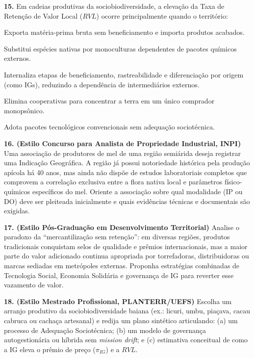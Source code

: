 \textbf{15.} Em cadeias produtivas da sociobiodiversidade, a elevação da Taxa de Retenção de Valor Local ($RVL$) ocorre principalmente quando o território:
\begin{alternativas}
  \item Exporta matéria-prima bruta sem beneficiamento e importa produtos acabados.
  \item Substitui espécies nativas por monoculturas dependentes de pacotes químicos externos.
  \item Internaliza etapas de beneficiamento, rastreabilidade e diferenciação por origem (como IGs), reduzindo a dependência de intermediários externos.
  \item Elimina cooperativas para concentrar a terra em um único comprador monopsônico.
  \item Adota pacotes tecnológicos convencionais sem adequação sociotécnica.
\end{alternativas}


\textbf{16. (Estilo Concurso para Analista de Propriedade Industrial, INPI)} Uma associação de produtores de mel de uma região semiárida deseja registrar uma Indicação Geográfica. A região já possui notoriedade histórica pela produção apícola há 40 anos, mas ainda não dispõe de estudos laboratoriais completos que comprovem a correlação exclusiva entre a flora nativa local e parâmetros físico-químicos específicos do mel. Oriente a associação sobre qual modalidade (IP ou DO) deve ser pleiteada inicialmente e quais evidências técnicas e documentais são exigidas.
\espacoResolucao[2.2cm]

\textbf{17. (Estilo Pós-Graduação em Desenvolvimento Territorial)} Analise o paradoxo da ``mercantilização sem retenção'': em diversas regiões, produtos tradicionais conquistam selos de qualidade e prêmios internacionais, mas a maior parte do valor adicionado continua apropriada por torrefadoras, distribuidoras ou marcas sediadas em metrópoles externas. Proponha estratégias combinadas de Tecnologia Social, Economia Solidária e governança de IG para reverter esse vazamento de valor.
\espacoResolucao[2.2cm]

\textbf{18. (Estilo Mestrado Profissional, PLANTERR/UEFS)} Escolha um arranjo produtivo da sociobiodiversidade baiana (ex.: licuri, umbu, piaçava, cacau cabruca ou cachaça artesanal) e redija um plano sintético articulando: (a) um processo de Adequação Sociotécnica; (b) um modelo de governança autogestionária ou híbrida sem \textit{mission drift}; e (c) estimativa conceitual de como a IG eleva o prêmio de preço ($\pi_{IG}$) e a $RVL$.
\espacoResolucao[2.2cm]

